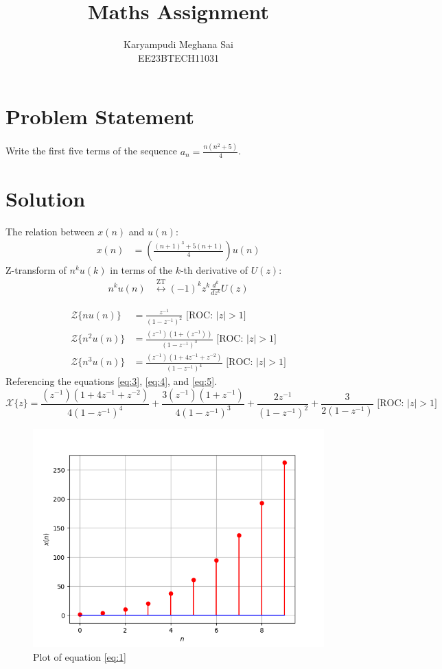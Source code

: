 \documentclass{article}
\providecommand{\brak}[1]{\ensuremath{\left(#1\right)}}
\begin{document}
\title{Maths Assignment}
\author{Karyampudi Meghana Sai\\ EE23BTECH11031}
\maketitle

\section*{Problem Statement}
Write the first five terms of the sequence \(a_n = \frac{n(n^2+5)}{4}\).

\section*{Solution}
The relation between \(x(n)\) and \(u(n)\):
\begin{align}
 x(n) &= \left(\frac{(n+1)^3+5(n+1)}{4}\right) u(n)\label{eq:1}
\end{align}
Z-transform of \(n^ku(k)\) in terms of the \(k\)-th derivative of \(U(z)\):
\begin{align}
n^k u(n) &\overset{\text{ZT}}{\longleftrightarrow} (-1)^k z^k \frac{d^k}{dz^k}U(z)
\end{align}

\begin{align}
    \mathcal{Z}\{nu(n)\} &= \frac{z^{-1}}{\brak{1 - z^{-1}}^2}\label{eq:3} \text{ [ROC: } \lvert z \rvert > 1\text{]} \\
    \mathcal{Z}\{n^2u(n)\} &= \frac{\brak{z^{-1}}(1+\brak{z^{-1}})}{\brak{1 - z^{-1}}^3}\label{eq:4} \text{ [ROC: } \lvert z \rvert > 1\text{]} \\
    \mathcal{Z}\{n^3u(n)\} &= \frac{\brak{z^{-1}}\brak{1+4z^{-1}+z^{-2}}}{\brak{1 - z^{-1}}^4}\label{eq:5} \text{ [ROC: } \lvert z \rvert > 1\text{]}
\end{align}
Referencing the equations \eqref{eq:3}, \eqref{eq:4}, and \eqref{eq:5}.
\begin{equation}
\mathcal{X}\{z\} = \frac{\brak{z^{-1}}(1+4z^{-1}+z^{-2})}{4\brak{1-z^{-1}}^4} + \frac{3\brak{z^{-1}}(1+z^{-1})}{4\brak{1-z^{-1}}^3} + \frac{2z^{-1}}{\brak{1 - z^{-1}}^2} + \frac{3}{2\brak{1- z^{-1}}} \text{ [ROC: } \lvert z \rvert > 1\text{]}
\end{equation}

\newpage
\begin{figure}
    \centering
    \includegraphics{figs/plot.png}
    \caption{Plot of equation \eqref{eq:1}\label{fig:plot}}
\end{figure}
\end{document}
